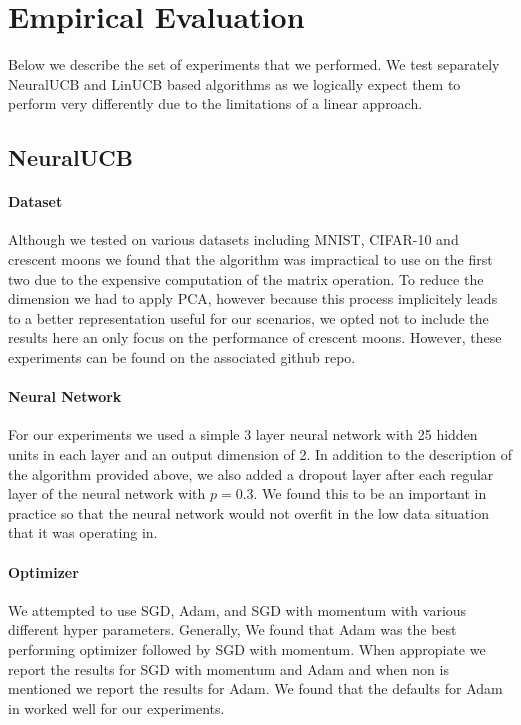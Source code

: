 \documentclass{article}
\begin{document}
\section{Empirical Evaluation}
Below we describe the set of experiments that we performed.
We test separately NeuralUCB and LinUCB based algorithms as we logically expect them to perform
very differently due to the limitations of a linear approach.

\subsection{NeuralUCB}

\paragraph{Dataset}
Although we tested on various datasets including MNIST, CIFAR-10 and crescent moons
we found that the algorithm was impractical to use on the first two due to the expensive computation
of the matrix operation.
To reduce the dimension we had to apply PCA, however because this process implicitely leads to a better representation
useful for our scenarios, we opted not to include the results here an only focus on the performance of crescent moons.
However, these experiments can be found on the associated github repo.

\paragraph{Neural Network}
For our experiments we used a simple 3 layer neural network with 25 hidden units in each layer and an output dimension of 2.
In addition to the description of the algorithm provided above, we also added a dropout layer after each regular layer of the neural network with
$p =0.3$. We found this to be an important in practice so that the neural network would not overfit in the low data situation that it was operating in.

\paragraph{Optimizer}
We attempted to use SGD, Adam, and SGD with momentum with various different hyper parameters.
Generally, We found that Adam was the best performing optimizer followed by SGD with momentum.
When appropiate we report the results for SGD with momentum and Adam and when non is mentioned we report the results for Adam.
We found that the defaults for Adam in \cite{adam} worked well for our experiments.
\end{document}
